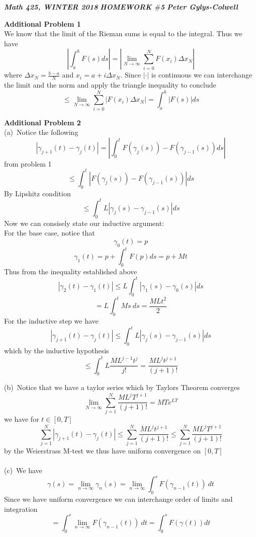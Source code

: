 \documentclass[12pt]{article}
\newenvironment{ques}[1]{\textbf{#1}\vspace{1 mm}\\ }{\bigskip}
\theoremstyle{definition}
\renewcommand{\l}{\left }
\renewcommand{\r}{\right }
\begin{document}
\noindent \textit{\textbf{Math 425, WINTER 2018}} \hspace{1.3cm}
\textit{\textbf{HOMEWORK $\#$5}} \hspace{1.3cm} \textit{\textbf{Peter
Gylys-Colwell}} 

\vspace{1cm}
\begin{ques}{Additional Problem 1}
	We know that the limit of the Rieman sums is equal to the integral. Thus we have
	$$\l|\int_a^b F(s) ds \r| = \l| \lim_{N \to \infty} \sum_{i = 0}^N
	F(x_i)\Delta x_N \r|$$
	where $\Delta x_N = \frac{b-a}{N}$ and $x_i = a + i\Delta x_N$. Since
	$|\cdot |$ is continuous we can interchange the limit and the norm and
	apply the triangle inequality to conclude
	$$\leq \lim_{N \to \infty} \sum_{i = 0}^N
	\l| F(x_i)\Delta x_N \r| = \int_{a}^b \l| F(s)\r| ds $$
\end{ques}

\begin{ques}{Additional Problem 2}
	(a)\
	Notice the following
	$$\l|\gamma_{j+1}(t) - \gamma_j(t)\r| = \l|\int_0^t F(\gamma_j(s)) -
	F(\gamma_{j-1}(s)) ds \r|$$
	from problem 1
	$$\leq \int_0^t \l|F(\gamma_j(s)) -
	F(\gamma_{j-1}(s))\r| ds $$
	By Lipshitz condition
	$$\leq \int_0^t L\l|\gamma_j(s) -
	\gamma_{j-1}(s)\r| ds$$
	Now we can consisely state our inductive argument:\\
	For the base case, notice that 
	$$\gamma_0(t) = p$$
	$$\gamma_1(t) = p + \int_0^t F(p)ds = p + Mt$$
	Thus from the inequality established above
	$$|\gamma_2(t) - \gamma_1(t)| \leq L\int_0^t |\gamma_1(s) - \gamma_0(s)| ds$$
	$$= L\int_0^t Ms\ ds = \frac{MLt^2}{2}$$
	For the inductive step we have
	$$\l|\gamma_{j+1}(t) - \gamma_j(t)\r| \leq \int_0^t L\l|\gamma_j(s) -
	\gamma_{j-1}(s)\r| ds$$
	which by the inductive hypothesis
	$$\leq \int_0^t L\frac{ML^{j-1}t^j}{j!} = \frac{ML^jt^{j+1}}{(j+1)!}$$

	(b)\ Notice that we have a taylor series which by Taylors Theorem converges
	$$\lim_{N \to \infty} \sum_{j=1}^N\frac{ML^jT^{j+1}}{(j+1)!} = MTe^{LT}$$
	we have for $t \in [0,T]$
	$$ \sum_{j=1}^N |\gamma_{j+1}(t) - \gamma_j(t)|
	\leq \sum_{j=1}^N\frac{ML^jt^{j+1}}{(j+1)!} \leq
	\sum_{j=1}^N\frac{ML^jT^{j+1}}{(j+1)!} $$
	by the Weierstrass M-test we thus have uniform convergence on $[0,T]$\\
	\\
	(c)\ We have
	$$\gamma(s) = \lim_{n \to \infty}\gamma_n(s) = \lim_{n \to \infty}
	\int_0^s F(\gamma_{n-1}(t))\ dt$$
	Since we have uniform convergence we can interchange order of limits and integration
	$$= \int_0^s \lim_{n \to \infty} F(\gamma_{n-1}(t))\ dt = \int_0^s F(\gamma(t)) dt$$

\end{ques}
\end{document}
